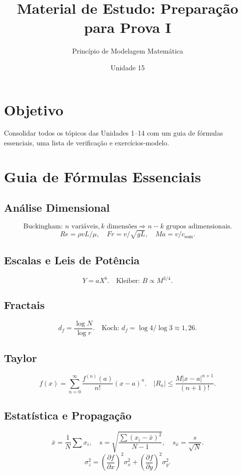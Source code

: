 \documentclass[12pt,a4paper]{article}
\title{Material de Estudo: Prepara\c{c}\~ao para Prova I}
\author{Princ\'ipio de Modelagem Matem\'atica}
\date{Unidade 15}
\begin{document}
\maketitle

\section*{Objetivo}
Consolidar todos os t\'opicos das Unidades 1--14 com um guia de f\'ormulas essenciais, uma lista de verificação e exerc\'icios-modelo.

\section*{Guia de F\'ormulas Essenciais}

\subsection*{An\'alise Dimensional}
\[
\text{Buckingham: } n \text{ vari\'aveis}, k \text{ dimens\~oes} \Rightarrow n-k \text{ grupos adimensionais.}
\]
\[
Re = \rho v L/\mu, \quad Fr = v/\sqrt{gL}, \quad Ma = v/c_\text{som}.
\]

\subsection*{Escalas e Leis de Pot\^encia}
\[
Y = aX^b. \quad \text{Kleiber: } B \propto M^{3/4}.
\]

\subsection*{Fractais}
\[
d_f = \frac{\log N}{\log r}. \quad \text{Koch: } d_f = \log4/\log3 \approx 1{,}26.
\]

\subsection*{Taylor}
\[
f(x) = \sum_{n=0}^\infty \frac{f^{(n)}(a)}{n!}(x-a)^n. \quad |R_n| \le \frac{M|x-a|^{n+1}}{(n+1)!}.
\]

\subsection*{Estat\'istica e Propaga\c{c}\~ao}
\[
\bar x = \frac{1}{N}\sum x_i, \quad s = \sqrt{\frac{\sum(x_i-\bar x)^2}{N-1}}, \quad s_{\bar x} = \frac{s}{\sqrt{N}}.
\]
\[
\sigma_z^2 = \left(\frac{\partial f}{\partial x}\right)^2\!\sigma_x^2 + \left(\frac{\partial f}{\partial y}\right)^2\!\sigma_y^2.
\]
\end{document}
